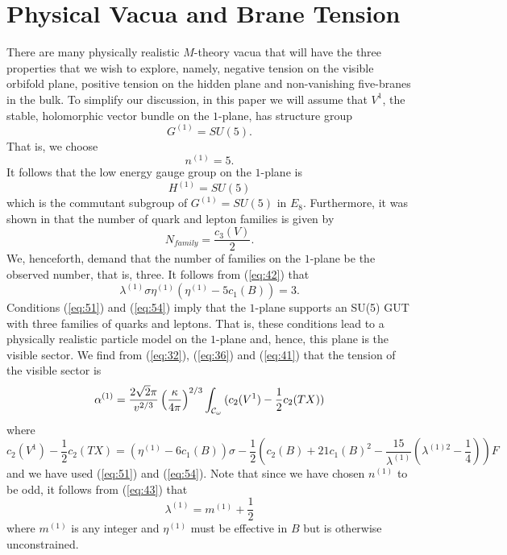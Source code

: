 \documentclass[a4paper,12pt]{article}
\numberwithin{equation}{section}
\theoremstyle{plain}
\begin{document}
\section{Physical Vacua and Brane Tension}

There are many  physically realistic $M$-theory vacua that will
have the three properties that we wish to explore, namely, negative tension on
the visible orbifold plane, positive tension on the hidden plane and
non-vanishing five-branes in the bulk. To simplify our discussion, in this
paper we will assume that $V^{1}$, the stable, holomorphic vector bundle on
the $1$-plane, has structure group 
%
\begin{equation}
G^{(1)}=SU(5).
\label{eq:50}
\end{equation}
%
That is, we choose
%
\begin{equation}
n^{(1)}=5.
\label{eq:51}
\end{equation}
%
It follows that the low energy gauge group on the $1$-plane is
%
\begin{equation}
H^{(1)}=SU(5)
\label{eq:52}
\end{equation}
%
which is the commutant subgroup of $G^{(1)}=SU(5)$ in $E_{8}$.
Furthermore, it was shown in \cite{C} that the number 
of quark and lepton families is given by
%
\begin{equation}
N_{family}=\frac{c_{3}(V)}{2}.
\label{eq:53}
\end{equation}
%
We, henceforth, demand that the number of families on the $1$-plane be the
observed number, that is, three. It follows from (\ref{eq:42}) that
%
\begin{equation}
\lambda^{(1)} \sigma \eta^{(1)}(\eta^{(1)}-5c_{1}(B))=3.
\label{eq:54}
\end{equation}
%
Conditions (\ref{eq:51}) and (\ref{eq:54}) imply that the $1$-plane supports 
an SU(5) GUT with three families of quarks and leptons. That is, these conditions
lead to a physically realistic particle model on the $1$-plane and, hence, this
plane is the visible sector. We find from (\ref{eq:32}), (\ref{eq:36}) 
and (\ref{eq:41}) that the tension of the visible sector is
%
\begin{equation}
\alpha^{(1)}=\frac{2\sqrt{2}\pi}{v^{2/3}}\left(\frac{\kappa}{4\pi}\right)^{2/3}
\int_{{\cal{C}}_{\omega}}{(c_{2}(V^{1})-\frac{1}{2}c_{2}(TX))}
\label{eq:55}
\end{equation}
%
where
%
\begin{equation}
c_{2}(V^{1})-\frac{1}{2}c_{2}(TX)=(\eta^{(1)}-6c_{1}(B))\sigma
-\frac{1}{2}\left(c_{2}(B)+21c_{1}(B)^{2}-\frac{15}{\lambda^{(1)}}
\left(\lambda^{(1)2}-\frac{1}{4}\right)\right)F
\label{eq:56}
\end{equation}
%
and we have used (\ref{eq:51}) and (\ref{eq:54}). Note that since we have
chosen $n^{(1)}$ to be odd, it follows from (\ref{eq:43}) that
%
\begin{equation}
\lambda^{(1)}=m^{(1)}+\frac{1}{2}
\label{eq:57}
\end{equation}
%
where $m^{(1)}$ is any integer and $\eta^{(1)}$ must be effective in $B$ but is
otherwise unconstrained.
\end{document}
